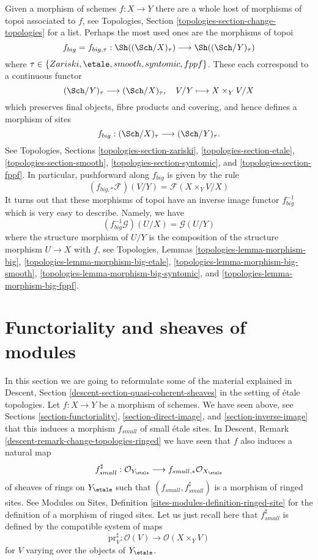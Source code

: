 \noindent
Given a morphism of schemes $f : X \to Y$ there are a whole host of
morphisms of topoi associated to $f$, see
Topologies, Section \ref{topologies-section-change-topologies}
for a list. Perhaps the most used ones are the morphisms of topoi
$$
f_{big} = f_{big, \tau} :
\Sh((\Sch/X)_\tau)
\longrightarrow
\Sh((\Sch/Y)_\tau)
$$
where $\tau \in \{Zariski, \etale, smooth, syntomic, fppf\}$.
These each correspond to a continuous functor
$$
(\Sch/Y)_\tau \longrightarrow (\Sch/X)_\tau, \quad
V/Y \longmapsto X \times_Y V/X
$$
which preserves final objects, fibre products and covering, and hence
defines a morphism of sites
$$
f_{big} : (\Sch/X)_\tau \longrightarrow (\Sch/Y)_\tau.
$$
See
Topologies, Sections \ref{topologies-section-zariski},
\ref{topologies-section-etale},
\ref{topologies-section-smooth},
\ref{topologies-section-syntomic}, and
\ref{topologies-section-fppf}.
In particular, pushforward along $f_{big}$ is given by the rule
$$
(f_{big, *}\mathcal{F})(V/Y) = \mathcal{F}(X \times_Y V/X)
$$
It turns out that these morphisms of topoi have an inverse
image functor $f_{big}^{-1}$ which is very easy to describe.
Namely, we have
$$
(f_{big}^{-1}\mathcal{G})(U/X) = \mathcal{G}(U/Y)
$$
where the structure morphism of $U/Y$ is the composition of the
structure morphism $U \to X$ with $f$, see
Topologies, Lemmas \ref{topologies-lemma-morphism-big},
\ref{topologies-lemma-morphism-big-etale},
\ref{topologies-lemma-morphism-big-smooth},
\ref{topologies-lemma-morphism-big-syntomic}, and
\ref{topologies-lemma-morphism-big-fppf}.







\section{Functoriality and sheaves of modules}
\label{section-morphisms-modules}

\noindent
In this section we are going to reformulate some of the material explained in
Descent, Section \ref{descent-section-quasi-coherent-sheaves}
in the setting of \'etale topologies. Let $f : X \to Y$ be a morphism of
schemes. We have seen above, see
Sections \ref{section-functoriality}, \ref{section-direct-image}, and
\ref{section-inverse-image}
that this induces a morphism $f_{small}$ of small \'etale sites. In
Descent, Remark \ref{descent-remark-change-topologies-ringed}
we have seen that $f$ also induces a natural map
$$
f_{small}^\sharp :
\mathcal{O}_{Y_\etale}
\longrightarrow
f_{small, *}\mathcal{O}_{X_\etale}
$$
of sheaves of rings on
$Y_\etale$ such that $(f_{small}, f_{small}^\sharp)$
is a morphism of ringed sites. See
Modules on Sites, Definition \ref{sites-modules-definition-ringed-site}
for the definition of a morphism of ringed sites.
Let us just recall here that $f_{small}^\sharp$ is defined by the
compatible system of maps
$$
\text{pr}_V^\sharp : \mathcal{O}(V) \longrightarrow \mathcal{O}(X \times_Y V)
$$
for $V$ varying over the objects of $Y_\etale$.

